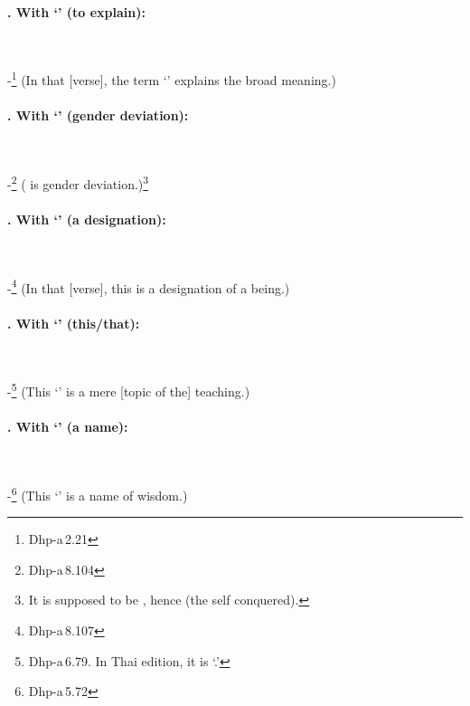 \paragraph*{. With `' (to explain):}\ \par
-\footnote{Dhp-a\,2.21} (In that [verse], the term `' explains the broad meaning.)\par

\paragraph*{. With `' (gender deviation):}\ \par
-\footnote{Dhp-a\,8.104} ( is gender deviation.)\footnote{It is supposed to be , hence  (the self conquered).}\par

\paragraph*{. With `' (a designation):}\ \par
-\footnote{Dhp-a\,8.107} (In that [verse], this  is a designation of a being.)\par

\paragraph*{. With `' (this/that):}\ \par
-\footnote{Dhp-a\,6.79. In Thai edition, it is `.'} (This `' is a mere [topic of the] teaching.)\par

\paragraph*{. With `' (a name):}\ \par
-\footnote{Dhp-a\,5.72} (This `' is a name of wisdom.)\par

